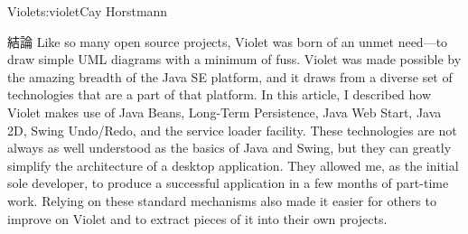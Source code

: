 \begin{aosachapter}{Violet}{s:violet}{Cay Horstmann}
\begin{aosasect1}{結論}
Like so many open source projects, Violet was born of an unmet
need---to draw simple UML diagrams with a minimum of fuss. Violet was
made possible by the amazing breadth of the Java SE platform, and it
draws from a diverse set of technologies that are a part of that
platform. In this article, I described how Violet makes use of Java
Beans, Long-Term Persistence, Java Web Start, Java 2D, Swing
Undo/Redo, and the service loader facility.  These technologies are
not always as well understood as the basics of Java and Swing, but
they can greatly simplify the architecture of a desktop
application. They allowed me, as the initial sole developer, to
produce a successful application in a few months of part-time work.
Relying on these standard mechanisms also made it easier for others to
improve on Violet and to extract pieces of it into their own projects.

\end{aosasect1}

\end{aosachapter}
